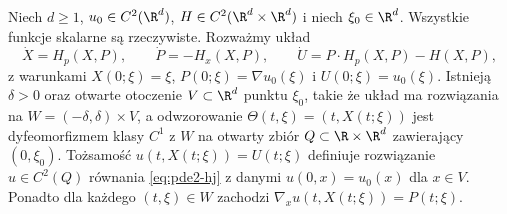 \begin{stwierdzenie}
\label{prop:pde2-hamilton}
Niech $d\geq1$, $u_0\in C^2(\R^d)$,
$H\in C^2(\R^d\times\R^d)$ i niech $\xi_0\in\R^d$.
Wszystkie funkcje skalarne są rzeczywiste.
Rozważmy układ
\begin{equation}\label{eq:pde2-hamilton-odes}
 \dot X=H_p(X,P),\qquad
 \dot P=-H_x(X,P),\qquad
 \dot U=P\cdot H_p(X,P)-H(X,P),
\end{equation}
z warunkami $X(0;\xi)=\xi$,
$P(0;\xi)=\nabla u_0(\xi)$ i $U(0;\xi)=u_0(\xi)$.
Istnieją $\delta>0$ oraz otwarte otoczenie
$V\subset\R^d$ punktu $\xi_0$, takie że układ ma
rozwiązania na $W=(-\delta,\delta)\times V$,
a odwzorowanie $\Theta(t,\xi)=(t,X(t;\xi))$ jest
dyfeomorfizmem klasy $C^1$ z $W$ na otwarty zbiór
$Q\subset\R\times\R^d$ zawierający $(0,\xi_0)$.
Tożsamość $u(t,X(t;\xi))=U(t;\xi)$ definiuje
rozwiązanie $u\in C^2(Q)$ równania \eqref{eq:pde2-hj}
z danymi $u(0,x)=u_0(x)$ dla $x\in V$.
Ponadto dla każdego $(t,\xi)\in W$ zachodzi
$\nabla_xu(t,X(t;\xi))=P(t;\xi)$.
\end{stwierdzenie}
